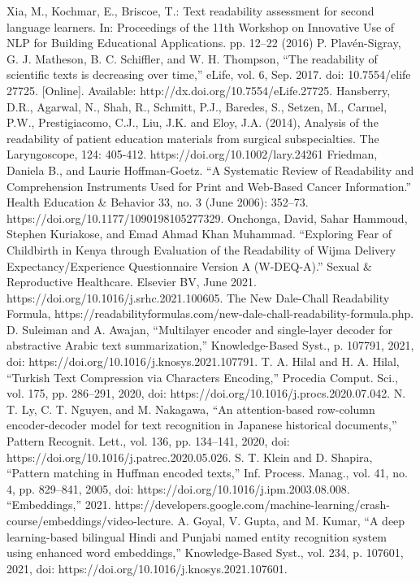 \documentclass[conference]{IEEEtran}
\begin{document}
\begin{thebibliography}{00}
 Xia, M., Kochmar, E., Briscoe, T.: Text readability assessment for second language learners. In: Proceedings of the 11th Workshop on Innovative Use of NLP for Building Educational Applications. pp. 12–22 (2016)
 P. Plavén-Sigray, G. J. Matheson, B. C. Schiffler, and W. H. Thompson, “The readability of scientific texts is decreasing over time,” eLife, vol. 6, Sep. 2017. doi: 10.7554/elife 27725. [Online]. Available: http://dx.doi.org/10.7554/eLife.27725.
 Hansberry, D.R., Agarwal, N., Shah, R., Schmitt, P.J., Baredes, S., Setzen, M., Carmel, P.W., Prestigiacomo, C.J., Liu, J.K. and Eloy, J.A. (2014), Analysis of the readability of patient education materials from surgical subspecialties. The Laryngoscope, 124: 405-412. https://doi.org/10.1002/lary.24261
 Friedman, Daniela B., and Laurie Hoffman-Goetz. “A Systematic Review of Readability and Comprehension Instruments Used for Print and Web-Based Cancer Information.” Health Education \& Behavior 33, no. 3 (June 2006): 352–73. https://doi.org/10.1177/1090198105277329.
 Onchonga, David, Sahar Hammoud, Stephen Kuriakose, and Emad Ahmad Khan Muhammad. “Exploring Fear of Childbirth in Kenya through Evaluation of the Readability of Wijma Delivery Expectancy/Experience Questionnaire Version A (W-DEQ-A).” Sexual \& Reproductive Healthcare. Elsevier BV, June 2021. https://doi.org/10.1016/j.srhc.2021.100605.
 The New Dale-Chall Readability Formula, https://readabilityformulas.com/new-dale-chall-readability-formula.php.
 D. Suleiman and A. Awajan, “Multilayer encoder and single-layer decoder for abstractive Arabic text summarization,” Knowledge-Based Syst., p. 107791, 2021, doi: https://doi.org/10.1016/j.knosys.2021.107791.
 T. A. Hilal and H. A. Hilal, “Turkish Text Compression via Characters Encoding,” Procedia Comput. Sci., vol. 175, pp. 286–291, 2020, doi: https://doi.org/10.1016/j.procs.2020.07.042.
 N. T. Ly, C. T. Nguyen, and M. Nakagawa, “An attention-based row-column encoder-decoder model for text recognition in Japanese historical documents,” Pattern Recognit. Lett., vol. 136, pp. 134–141, 2020, doi: https://doi.org/10.1016/j.patrec.2020.05.026.
 S. T. Klein and D. Shapira, “Pattern matching in Huffman encoded texts,” Inf. Process. Manag., vol. 41, no. 4, pp. 829–841, 2005, doi: https://doi.org/10.1016/j.ipm.2003.08.008.
 “Embeddings,” 2021. https://developers.google.com/machine-learning/crash-course/embeddings/video-lecture.
 A. Goyal, V. Gupta, and M. Kumar, “A deep learning-based bilingual Hindi and Punjabi named entity recognition system using enhanced word embeddings,” Knowledge-Based Syst., vol. 234, p. 107601, 2021, doi: https://doi.org/10.1016/j.knosys.2021.107601.

\end{thebibliography}
\end{document}
